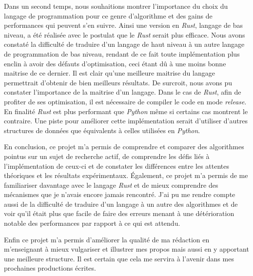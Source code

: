 \documentclass[12pt,a4paper]{article}
\begin{document}
Dans un second temps, nous souhaitions montrer l'importance du choix du langage de programmation pour ce genre d'algorithme et des gains de performances qui peuvent s'en suivre. Ainsi une version en \emph{Rust}, langage de bas niveau, a été réalisée avec le postulat que le \emph{Rust} serait plus efficace. Nous avons constaté la difficulté de traduire d'un langage de haut niveau à un autre langage de programmation de bas niveau, rendant de ce fait toute implémentation plus enclin à avoir des défauts d'optimisation, ceci étant dû à une moins bonne maitrise de ce dernier. Il est clair qu'une meilleure maitrise du langage permettrait d'obtenir de bien meilleurs résultats. De surcroit, nous avons pu constater l'importance de la maitrise d'un langage. Dans le cas de \emph{Rust}, afin de profiter de ses optimisation, il est nécessaire de compiler le code en mode \emph{release}. En finalité \emph{Rust} est plus performant que \emph{Python} même si certains cas montrent le contraire. Une piste pour améliorer cette implémentation serait d'utiliser d'autres structures de données que équivalents à celles utilisées en \emph{Python}.

En conclusion, ce projet m'a permis de comprendre et comparer des algorithmes pointus sur un sujet de recherche actif, de comprendre les défis liés à l'implémentation de ceux-ci et de constater les différences entre les attentes théoriques et les résultats expérimentaux. Également, ce projet m'a permis de me familiariser davantage avec le langage \emph{Rust} et de mieux comprendre des mécanismes que je n'avais encore jamais rencontré. J'ai pu me rendre compte aussi de la difficulté de traduire d'un langage à un autre des algorithmes et de voir qu'il était plus que facile de faire des erreurs menant à une détérioration notable des performances par rapport à ce qui est attendu.

Enfin ce projet m'a permis d'améliorer la qualité de ma rédaction en m'enseignant à mieux vulgariser et illustrer mes propos mais aussi en y apportant une meilleure structure. Il est certain que cela me servira à l'avenir dans mes prochaines productions écrites.


\newpage



\appendix
\end{document}
